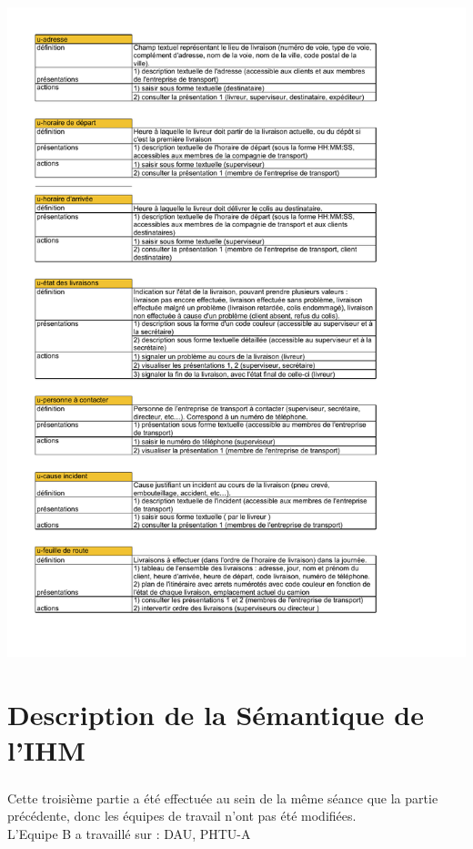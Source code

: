 \documentclass{report}
\begin{document}
\includegraphics[scale = 0.7, page = 2]{images/DPOU.pdf}


\chapter{Description de la Sémantique de l'IHM}

\paragraph{}
Cette troisième partie a été effectuée au sein de la même séance que la partie précédente, donc les équipes de travail n'ont pas été modifiées.\\

L'Equipe B a travaillé sur : DAU, PHTU-A\\
\end{document}

